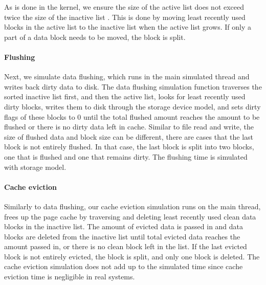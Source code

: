 \documentclass[conference]{IEEEtran}
\begin{document}
            As is done in the kernel, we ensure the size of the active list does not 
            exceed twice the size of the inactive list 
            \cite{gorman2004understanding, linuxdev3rd2010}. 
            This is done by moving least recently used blocks in the active list 
            to the inactive list when the active list grows. If only a part of a data 
            block needs to be moved, the block is split.

            \paragraph*{Flushing}
            Next, we simulate data flushing, which runs in the main simulated 
            thread and writes back dirty data to disk. 
            The data flushing simulation function traverses the sorted 
            inactive list first, and then the active list, looks for least recently used 
            dirty blocks, writes them to disk through the storage device model, 
            and sets dirty flags of these blocks to 0 until the total flushed amount 
            reaches the amount to be flushed or there is no dirty data left in cache. 
            Similar to file read and write, the size of flushed data and block size 
            can be different, there are cases that the last block is not entirely flushed.  
            In that case, the last block is split into two blocks, one that is flushed 
            and one that remains dirty.
            The flushing time is simulated with storage model.
            
            \paragraph*{Cache eviction}    
            Similarly to data flushing, our cache eviction simulation runs on 
            the main thread, frees up the page cache by traversing and deleting 
            least recently used clean data blocks in the inactive list.
            The amount of evicted data is passed in and data blocks are deleted 
            from the inactive list until total evicted data reaches the amount 
            passed in, or there is no clean block left in the list.
            If the last evicted block is not entirely evicted, the block is split, 
            and only one block is deleted.
            The cache eviction simulation does not add up to the simulated time 
            since cache eviction time is negligible in real systems.        
            
\end{document}
